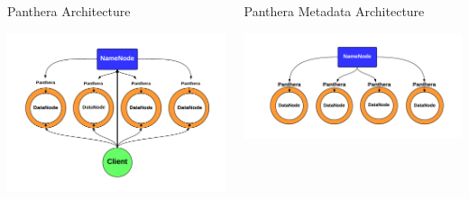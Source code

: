 \documentclass[final]{beamer} %
\begin{document}
\begin{frame}
\begin{columns}[t]
\begin{column}{0.32\textwidth}
	  \begin{block}{Panthera Architecture}
		\centerline{\includegraphics[scale=1.5]{assets/panthera_architecture_complete_larger.pdf}}	  
	  \end{block}

     \end{column}

    \begin{column}{0.32\textwidth}
	    	  
		\begin{block}{Panthera Metadata Architecture}
	 		\centerline{\includegraphics[scale=1.2]{assets/panthera_metadata_large.pdf}}
      	\end{block}


\end{column}
\end{columns}
\end{frame}
\end{document}
